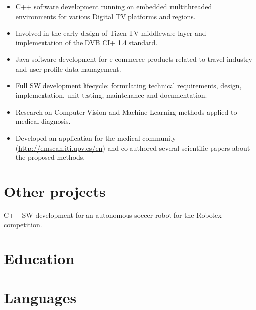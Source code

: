 \documentclass[11pt,a4paper,sans]{moderncv}
\begin{document}
{
  \begin{itemize}
  \item C++ software development running on embedded multithreaded environments for various Digital TV platforms and regions.
  \item Involved in the early design of Tizen TV middleware layer and implementation of the DVB CI+ 1.4 standard.
  \end{itemize}
}

{
  \begin{itemize}
  \item Java software development for e-commerce products related to travel industry and user profile data management.
  \item Full SW development lifecycle: formulating technical requirements, design, implementation, unit testing, maintenance and documentation.
  \end{itemize}
}

{ \begin{itemize}
  \item Research on Computer Vision and Machine Learning methods applied to medical diagnosis.
  \item Developed an application for the medical community (\url{http://dmscan.iti.upv.es/en}) and co-authored several scientific papers about the proposed methods.
\end{itemize} }

\section{Other projects}
{
  C++ SW development for an autonomous soccer robot for the Robotex competition.
}

\section{Education}

\section{Languages}
\begin{multicols}{3}
\end{multicols}

\renewcommand{\listitemsymbol}{-~}            %
\end{document}
